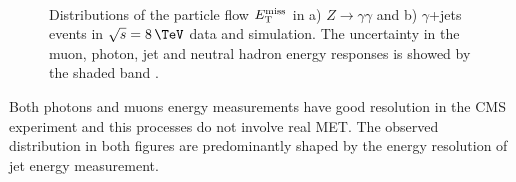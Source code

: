 \begin{figure}[!htp]%
\centering
{}\qquad
{}\\
 \caption[Distributions of the particle flow $\MET$ in $Z\rightarrow\gamma\gamma$ and $\gamma$+jets events in $\sqrt{s}=8\,\TeV$ data and simulation.]{Distributions of the particle flow $\MET$ in a) $Z\rightarrow\gamma\gamma$ and b) $\gamma$+jets events in $\sqrt{s}=8\,\TeV$ data and simulation. The uncertainty in the muon, photon, jet and neutral hadron energy responses is showed by the shaded band \cite{ARTICLE:CMSMETPerformance8TeV}.}
\label{FIGURE:EventReconstructionPhysicsObjects_METDistributionZmumu}
\end{figure}

Both photons and muons energy measurements have good resolution in the \gls{CMS} experiment and this processes do not involve real \gls{MET}. The observed distribution in both figures are predominantly shaped by the energy resolution of jet energy measurement.

